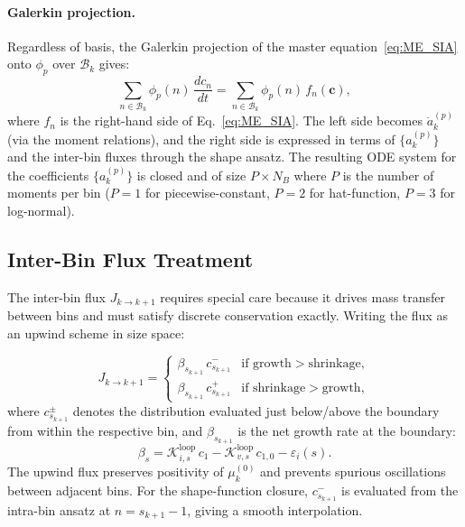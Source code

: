\paragraph{Galerkin projection.}
Regardless of basis, the Galerkin projection of the master
equation~\eqref{eq:ME_SIA} onto $\phi_p$ over $\mathcal{B}_k$ gives:
\begin{equation}\label{eq:galerkin}
    \sum_{n \in \mathcal{B}_k} \phi_p(n)\,\frac{dc_n}{dt}
    = \sum_{n \in \mathcal{B}_k} \phi_p(n)\,f_n(\mathbf{c}),
\end{equation}
where $f_n$ is the right-hand side of Eq.~\eqref{eq:ME_SIA}. The
left side becomes $\dot{a}_k^{(p)}$ (via the moment relations), and
the right side is expressed in terms of $\{a_k^{(p)}\}$ and the
inter-bin fluxes through the shape ansatz. The resulting ODE system
for the coefficients $\{a_k^{(p)}\}$ is closed and of size
$P \times N_B$ where $P$ is the number of moments per bin ($P = 1$
for piecewise-constant, $P = 2$ for hat-function, $P = 3$ for
log-normal).

\subsection{Inter-Bin Flux Treatment}
\label{sec:interbin_flux}

The inter-bin flux $J_{k \to k+1}$ requires special care because it
drives mass transfer between bins and must satisfy discrete conservation
exactly. Writing the flux as an upwind scheme in size space:

\begin{equation}\label{eq:flux_upwind}
    J_{k \to k+1} =
    \begin{cases}
        \beta_{s_{k+1}}\,c_{s_{k+1}}^- & \text{if growth} > \text{shrinkage},\\
        \beta_{s_{k+1}}\,c_{s_{k+1}}^+ & \text{if shrinkage} > \text{growth},
    \end{cases}
\end{equation}
where $c_{s_{k+1}}^{\pm}$ denotes the distribution evaluated just
below/above the boundary from within the respective bin, and
$\beta_{s_{k+1}}$ is the net growth rate at the boundary:
\begin{equation}\label{eq:beta}
    \beta_s = \mathcal{K}_{i,s}^{\mathrm{loop}}\,c_1
            - \mathcal{K}_{v,s}^{\mathrm{loop}}\,c_{1,0}
            - \varepsilon_i(s).
\end{equation}
The upwind flux preserves positivity of $\mu_k^{(0)}$ and prevents
spurious oscillations between adjacent bins. For the shape-function
closure, $c_{s_{k+1}}^-$ is evaluated from the intra-bin ansatz at
$n = s_{k+1} - 1$, giving a smooth interpolation.


